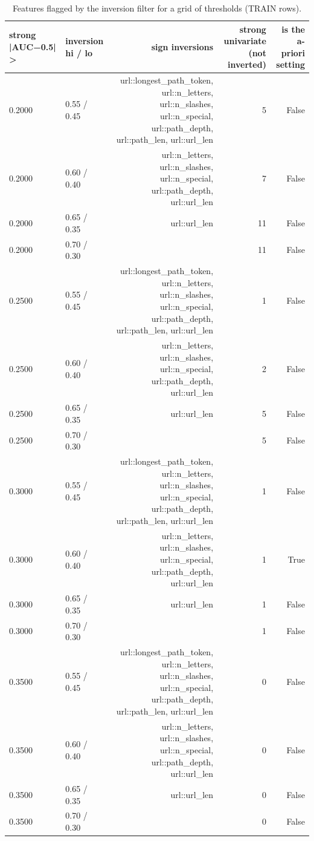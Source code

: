 \begin{table}[t]
\centering
\scriptsize
\caption{Features flagged by the inversion filter for a grid of thresholds (TRAIN rows).}
\label{tab:rev_R8_shortcut_threshold_sensitivity}
\begin{tabular}{llrrr}
\toprule
strong |AUC−0.5| > & inversion hi / lo & sign inversions & strong univariate (not inverted) & is the a-priori setting \\
\midrule
0.2000 & 0.55 / 0.45 & url::longest\_path\_token, url::n\_letters, url::n\_slashes, url::n\_special, url::path\_depth, url::path\_len, url::url\_len & 5 & False \\
0.2000 & 0.60 / 0.40 & url::n\_letters, url::n\_slashes, url::n\_special, url::path\_depth, url::url\_len & 7 & False \\
0.2000 & 0.65 / 0.35 & url::url\_len & 11 & False \\
0.2000 & 0.70 / 0.30 &  & 11 & False \\
0.2500 & 0.55 / 0.45 & url::longest\_path\_token, url::n\_letters, url::n\_slashes, url::n\_special, url::path\_depth, url::path\_len, url::url\_len & 1 & False \\
0.2500 & 0.60 / 0.40 & url::n\_letters, url::n\_slashes, url::n\_special, url::path\_depth, url::url\_len & 2 & False \\
0.2500 & 0.65 / 0.35 & url::url\_len & 5 & False \\
0.2500 & 0.70 / 0.30 &  & 5 & False \\
0.3000 & 0.55 / 0.45 & url::longest\_path\_token, url::n\_letters, url::n\_slashes, url::n\_special, url::path\_depth, url::path\_len, url::url\_len & 1 & False \\
0.3000 & 0.60 / 0.40 & url::n\_letters, url::n\_slashes, url::n\_special, url::path\_depth, url::url\_len & 1 & True \\
0.3000 & 0.65 / 0.35 & url::url\_len & 1 & False \\
0.3000 & 0.70 / 0.30 &  & 1 & False \\
0.3500 & 0.55 / 0.45 & url::longest\_path\_token, url::n\_letters, url::n\_slashes, url::n\_special, url::path\_depth, url::path\_len, url::url\_len & 0 & False \\
0.3500 & 0.60 / 0.40 & url::n\_letters, url::n\_slashes, url::n\_special, url::path\_depth, url::url\_len & 0 & False \\
0.3500 & 0.65 / 0.35 & url::url\_len & 0 & False \\
0.3500 & 0.70 / 0.30 &  & 0 & False \\
\bottomrule
\end{tabular}
\end{table}